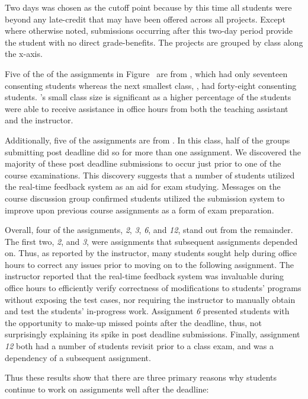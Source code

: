 Two days was chosen as the cutoff point because by this time all students were
beyond any late-credit that may have been offered across all projects. Except
where otherwise noted, submissions occurring after this two-day period provide
the student with no direct grade-benefits. The projects are grouped by class
along the x-axis.

Five of the of the assignments in Figure~ are from
, which had only seventeen consenting students whereas the next
smallest class, , had forty-eight consenting students. 's
small class size is significant as a higher percentage of the students were
able to receive assistance in office hours from both the teaching assistant and
the instructor.

Additionally, five of the assignments are from . In this class, half
of the groups submitting post deadline did so for more than one assignment. We
discovered the majority of these post deadline submissions to occur just prior
to one of the course examinations. This discovery suggests that a number of
students utilized the real-time feedback system as an aid for exam
studying. Messages on the course discussion group confirmed students utilized
the submission system to improve upon previous course assignments as a form of
exam preparation.

Overall, four of the assignments, \emph{2}, \emph{3}, \emph{6}, and \emph{12},
stand out from the remainder. The first two, \emph{2}, and \emph{3}, were
assignments that subsequent assignments depended on. Thus, as reported by the
instructor, many students sought help during office hours to correct any issues
prior to moving on to the following assignment. The instructor reported that
the real-time feedback system was invaluable during office hours to efficiently
verify correctness of modifications to students' programs without exposing the
test cases, nor requiring the instructor to manually obtain and test the
students' in-progress work. Assignment \emph{6} presented students with the
opportunity to make-up missed points after the deadline, thus, not surprisingly
explaining its spike in post deadline submissions. Finally, assignment
\emph{12} both had a number of students revisit prior to a class exam, and was
a dependency of a subsequent assignment.

Thus these results show that there are three primary reasons why students
continue to work on assignments well after the deadline:

